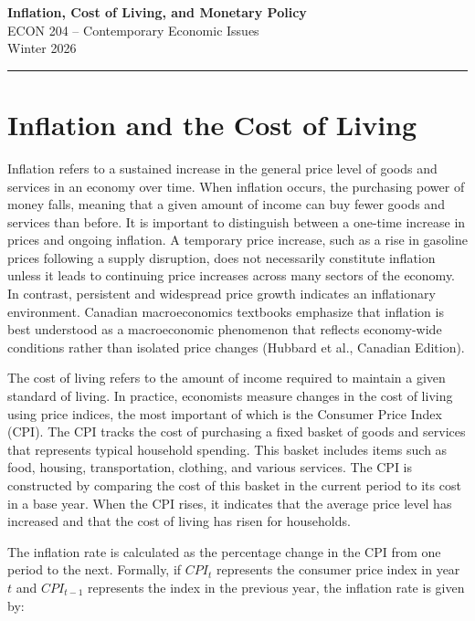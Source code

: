 \documentclass[12pt]{article}
\begin{document}
    {\LARGE \textbf{Inflation, Cost of Living, and Monetary Policy}}\\[0.5em]
    {\large ECON 204 -- Contemporary Economic Issues}\\[0.5em]
 Winter 2026\\


\hrule
\vspace{1em}



\section{Inflation and the Cost of Living}

Inflation refers to a sustained increase in the general price level of goods and services in an economy over time. When inflation occurs, the purchasing power of money falls, meaning that a given amount of income can buy fewer goods and services than before. It is important to distinguish between a one-time increase in prices and ongoing inflation. A temporary price increase, such as a rise in gasoline prices following a supply disruption, does not necessarily constitute inflation unless it leads to continuing price increases across many sectors of the economy. In contrast, persistent and widespread price growth indicates an inflationary environment. Canadian macroeconomics textbooks emphasize that inflation is best understood as a macroeconomic phenomenon that reflects economy-wide conditions rather than isolated price changes (Hubbard et al., Canadian Edition).

The cost of living refers to the amount of income required to maintain a given standard of living. In practice, economists measure changes in the cost of living using price indices, the most important of which is the Consumer Price Index (CPI). The CPI tracks the cost of purchasing a fixed basket of goods and services that represents typical household spending. This basket includes items such as food, housing, transportation, clothing, and various services. The CPI is constructed by comparing the cost of this basket in the current period to its cost in a base year. When the CPI rises, it indicates that the average price level has increased and that the cost of living has risen for households.

The inflation rate is calculated as the percentage change in the CPI from one period to the next. Formally, if $CPI_t$ represents the consumer price index in year $t$ and $CPI_{t-1}$ represents the index in the previous year, the inflation rate is given by:
\end{document}
